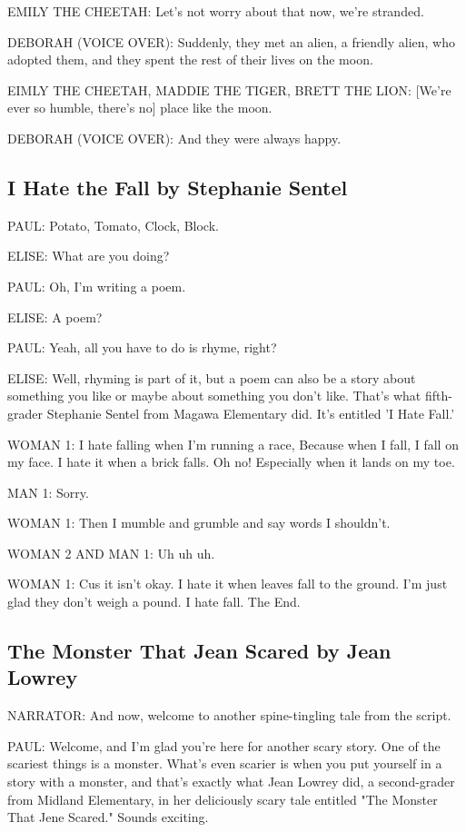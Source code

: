 EMILY THE CHEETAH:
Let's not worry about that now, we're stranded.

DEBORAH (VOICE OVER):
Suddenly, they met an alien, a friendly alien, who adopted them, and they spent the rest of their lives on the moon.

EIMLY THE CHEETAH, MADDIE THE TIGER, BRETT THE LION:
[We're ever so humble, there's no] place like the moon.

DEBORAH (VOICE OVER):
And they were always happy.

\subsection{I Hate the Fall by Stephanie Sentel}

PAUL:
Potato, Tomato, Clock, Block.

ELISE:
What are you doing?

PAUL:
Oh, I'm writing a poem.

ELISE:
A poem?

PAUL:
Yeah, all you have to do is rhyme, right?

ELISE:
Well, rhyming is part of it, but a poem can also be a story about something you like or maybe about something you don't like.
That's what fifth-grader Stephanie Sentel from Magawa Elementary did. It's entitled 'I Hate Fall.'

WOMAN 1:
I hate falling when I'm running a race,
Because when I fall, I fall on my face.
I hate it when a brick falls.
Oh no!
Especially when it lands on my toe.

MAN 1:
Sorry.

WOMAN 1:
Then I mumble and grumble and say words I shouldn't.

WOMAN 2 AND MAN 1:
Uh uh uh.

WOMAN 1:
Cus it isn't okay.
I hate it when leaves fall to the ground.
I'm just glad they don't weigh a pound.
I hate fall.
The End.

\subsection{The Monster That Jean Scared by Jean Lowrey}

NARRATOR:
And now, welcome to another spine-tingling tale from the script.

PAUL:
Welcome, and I'm glad you're here for another scary story.
One of the scariest things is a monster.
What's even scarier is when you put yourself in a story with a monster, and that's exactly what Jean Lowrey did, a second-grader from Midland Elementary, in her deliciously scary tale entitled "The Monster That Jene Scared."
Sounds exciting.

